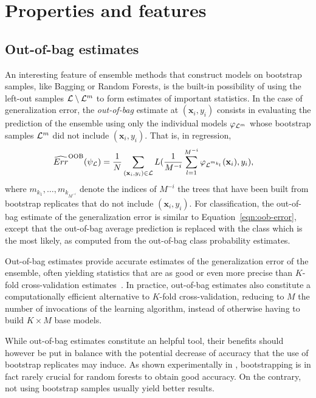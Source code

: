 \section{Properties and features}
\label{sec:4:features}

\subsection{Out-of-bag estimates}

An interesting  feature of ensemble methods that construct models
on bootstrap samples, like Bagging or Random Forests, is the built-in possibility of
using the left-out samples ${\cal L}\setminus {\cal L}^m$ to form
estimates of important statistics. In the case of generalization error, the
\textit{out-of-bag} estimate at $(\mathbf{x}_i,y_i)$ consists in evaluating the
prediction of the ensemble using only the individual models $\varphi_{{\cal
L}^m}$ whose bootstrap samples ${\cal L}^m$ did not include
$(\mathbf{x}_i,y_i)$. That is, in regression,
\begin{align}\label{eqn:oob-error}
\widehat{Err}^\text{OOB}(\psi_{\cal L}) &= \frac{1}{N} \sum_{(\mathbf{x}_i,y_i) \in {\cal L}} L(\frac{1}{M^{-i}} \sum_{l=1}^{M^{-i}} \varphi_{{\cal L}^{m_{k_l}}}(\mathbf{x}_i), y_i),
\end{align}
where $m_{k_1}, \dots, m_{k_{M^{-i}}}$ denote the indices of $M^{-i}$ the trees that
have been built from bootstrap replicates that do not include $(\mathbf{x}_i,
y_i)$. For classification, the out-of-bag estimate of the generalization error is similar to
Equation~\ref{eqn:oob-error}, except that the out-of-bag average prediction is
replaced with the class which is the most likely, as computed from the out-of-bag
class probability estimates.

Out-of-bag estimates provide accurate estimates of the
generalization error of the ensemble, often yielding statistics that are as
good or even more precise than $K$-fold cross-validation
estimates~\citep{wolpert:1999}. In practice, out-of-bag estimates also
constitute a computationally efficient alternative to $K$-fold cross-validation,
reducing to $M$ the number of invocations of the learning
algorithm, instead of otherwise having to build $K\times M$ base models.

While out-of-bag estimates constitute an helpful tool, their benefits should
however be put in balance with the potential decrease of accuracy that the use
of bootstrap replicates may induce. As shown experimentally in
\citep{louppe:2012}, bootstrapping is in fact rarely crucial for random forests
to obtain good accuracy. On the contrary, not using bootstrap samples usually
yield better results.

